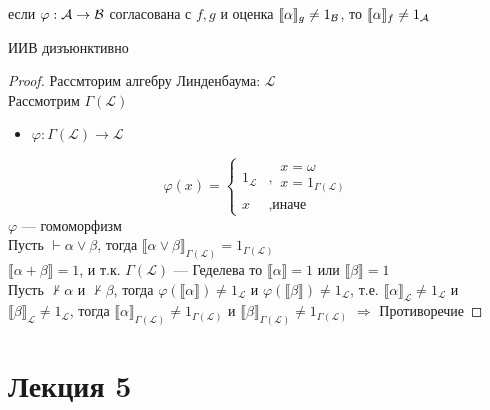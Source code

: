 \documentclass[oneside]{book}
\renewcommand{\leftmark}{}
\begin{document}
\begin{theorem}
	если \(\varphi: \mathcal{A} \to \mathcal{B}\) согласована с \(f, g\) и оценка \(\llbracket \alpha \rrbracket_g \neq 1_{\mathcal{B}}\), то \(\llbracket \alpha \rrbracket_f \neq 1_{\mathcal{A}}\)
	\label{org71afc3d}
\end{theorem}
\begin{theorem}
	ИИВ дизъюнктивно
	\label{org792679c}
\end{theorem}
\begin{proof}
	Рассмторим алгебру Линденбаума: \(\mathcal{L}\) \\
	Рассмотрим \(\Gamma(\mathcal{L})\) \\
	\begin{itemize}
		\item \(\varphi: \Gamma(\mathcal{L}) \to \mathcal{L}\)
	\end{itemize}
	\[ \varphi(x) = \begin{cases}1_\mathcal{L} & ,\substack{x =\omega \\ x = 1_{\Gamma(\mathcal{L})}} \\ x & , \text{иначе}\end{cases} \]
	\(\varphi\) --- гомоморфизм \\
	Пусть \(\vdash \alpha \vee \beta\), тогда \(\llbracket \alpha \vee \beta \rrbracket_{\Gamma(\mathcal{L})} = 1_{\Gamma(\mathcal{L})}\) \\
	\(\llbracket \alpha + \beta \rrbracket = 1\), и т.к. \(\Gamma(\mathcal{L})\) --- Геделева то \(\llbracket \alpha \rrbracket = 1\) или \(\llbracket \beta \rrbracket = 1\) \\
	Пусть \(\not \vdash \alpha\) и \(\not \vdash \beta\), тогда \(\varphi(\llbracket \alpha \rrbracket) \neq 1_\mathcal{L}\) и \(\varphi(\llbracket \beta \rrbracket) \neq 1_\mathcal{L}\), т.е. \(\llbracket \alpha \rrbracket_\mathcal{L} \neq 1_\mathcal{L}\) и \(\llbracket \beta \rrbracket_\mathcal{L} \neq 1_\mathcal{L}\), тогда \(\llbracket \alpha \rrbracket_{\Gamma(\mathcal{L})} \neq 1_{\Gamma(\mathcal{L})}\) и \(\llbracket \beta \rrbracket_{\Gamma(\mathcal{L})} \neq 1_{\Gamma(\mathcal{L})}\) \(\Rightarrow\) Противоречие
\end{proof}
\chapter*{Лекция 5}\renewcommand{\leftmark}{Лекция 5}
\label{sec:org2de2df5}
\end{document}
